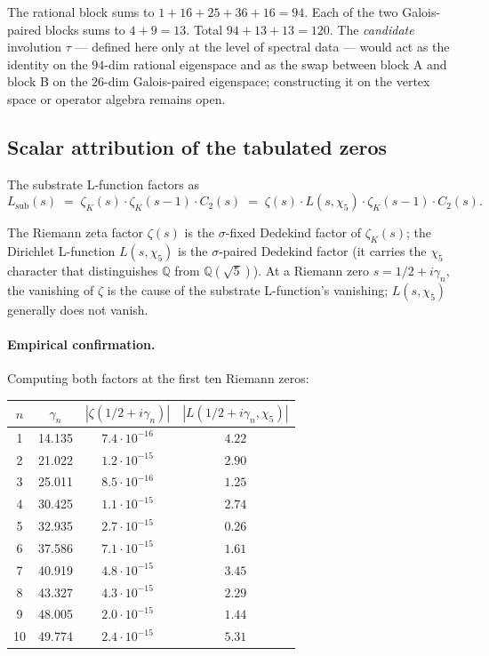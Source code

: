 \documentclass[11pt,a4paper]{article}
\newcommand{\Q}{\mathbb{Q}}
\newcommand{\Lsub}{L_{\mathrm{sub}}}
\begin{document}
The rational block sums to $1 + 16 + 25 + 36 + 16 = 94$. Each of
the two Galois-paired blocks sums to $4 + 9 = 13$. Total
$94 + 13 + 13 = 120$. The \emph{candidate} involution $\tau$ --- defined here only at
the level of spectral data --- would act as the identity on the
$94$-dim rational eigenspace and as the swap between block A and
block B on the $26$-dim Galois-paired eigenspace; constructing it
on the vertex space or operator algebra remains open.

\subsection{Scalar attribution of the tabulated zeros}

The substrate L-function factors as
\[
\Lsub(s) \;=\; \zeta_K(s) \cdot \zeta_K(s-1) \cdot C_2(s)
       \;=\; \zeta(s) \cdot L(s, \chi_5) \cdot \zeta_K(s-1) \cdot C_2(s).
\]

The Riemann zeta factor $\zeta(s)$ is the $\sigma$-fixed Dedekind
factor of $\zeta_K(s)$; the Dirichlet L-function
$L(s, \chi_5)$ is the $\sigma$-paired Dedekind factor (it carries
the $\chi_5$ character that distinguishes $\Q$ from $\Q(\sqrt 5)$).
At a Riemann zero $s = 1/2 + i\gamma_n$, the vanishing of $\zeta$
is the cause of the substrate L-function's vanishing; $L(s,
\chi_5)$ generally does not vanish.

\paragraph{Empirical confirmation.} Computing both factors at
the first ten Riemann zeros:

\begin{center}
\begin{tabular}{cccc}
\toprule
$n$ & $\gamma_n$ & $|\zeta(1/2 + i\gamma_n)|$ &
$|L(1/2 + i\gamma_n, \chi_5)|$ \\
\midrule
1  & 14.135 & $7.4 \cdot 10^{-16}$ & $4.22$  \\
2  & 21.022 & $1.2 \cdot 10^{-15}$ & $2.90$  \\
3  & 25.011 & $8.5 \cdot 10^{-16}$ & $1.25$  \\
4  & 30.425 & $1.1 \cdot 10^{-15}$ & $2.74$  \\
5  & 32.935 & $2.7 \cdot 10^{-15}$ & $0.26$  \\
6  & 37.586 & $7.1 \cdot 10^{-15}$ & $1.61$  \\
7  & 40.919 & $4.8 \cdot 10^{-15}$ & $3.45$  \\
8  & 43.327 & $4.3 \cdot 10^{-15}$ & $2.29$  \\
9  & 48.005 & $2.0 \cdot 10^{-15}$ & $1.44$  \\
10 & 49.774 & $2.4 \cdot 10^{-15}$ & $5.31$  \\
\bottomrule
\end{tabular}
\end{center}
\end{document}

